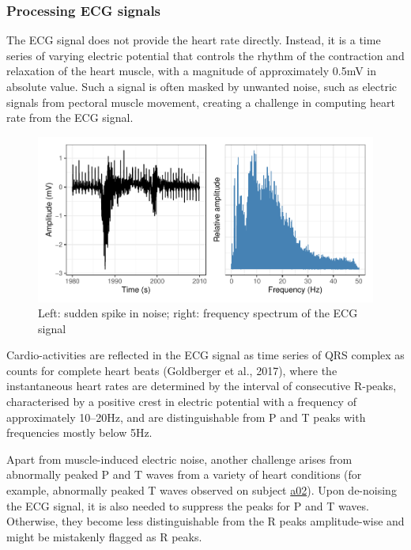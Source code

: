 \documentclass[
]{article}
\begin{document}
\hypertarget{processing-ecg-signals}{%
\subsubsection{Processing ECG signals}\label{processing-ecg-signals}}

The ECG signal does not provide the heart rate directly. Instead, it is
a time series of varying electric potential that controls the rhythm of
the contraction and relaxation of the heart muscle, with a magnitude of
approximately 0.5mV in absolute value. Such a signal is often masked by
unwanted noise, such as electric signals from pectoral muscle movement,
creating a challenge in computing heart rate from the ECG signal.

\begin{figure}

{\centering \includegraphics{report_files/figure-latex/ecg-noise-1} 

}

\caption{Left: sudden spike in noise; right: frequency spectrum of the ECG signal}\label{fig:ecg-noise}
\end{figure}

Cardio-activities are reflected in the ECG signal as time series of QRS
complex as counts for complete heart beats (Goldberger et al., 2017),
where the instantaneous heart rates are determined by the interval of
consecutive R-peaks, characterised by a positive crest in electric
potential with a frequency of approximately 10--20Hz, and are
distinguishable from P and T peaks with frequencies mostly below 5Hz.

Apart from muscle-induced electric noise, another challenge arises from
abnormally peaked P and T waves from a variety of heart conditions (for
example, abnormally peaked T waves observed on subject
\protect\hyperlink{visual}{a02}). Upon de-noising the ECG signal, it is
also needed to suppress the peaks for P and T waves. Otherwise, they
become less distinguishable from the R peaks amplitude-wise and might be
mistakenly flagged as R peaks.
\end{document}
